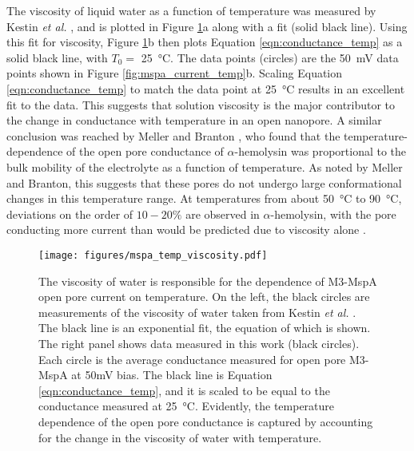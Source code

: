 The viscosity of liquid water as a function of temperature was measured by Kestin \textit{et al.} \cite{Kestin1978}, and is plotted in Figure \ref{fig:mspa_current_temp_viscosity}a along with a fit (solid black line).  Using this fit for viscosity, Figure \ref{fig:mspa_current_temp_viscosity}b then plots Equation \ref{eqn:conductance_temp} as a solid black line, with $T_0=$ \SI{25}{\degreeCelsius}.  The data points (circles) are the \SI{50}{\mV} data points shown in Figure \ref{fig:mspa_current_temp}b.  Scaling Equation \ref{eqn:conductance_temp} to match the data point at \SI{25}{\degreeCelsius} results in an excellent fit to the data.  This suggests that solution viscosity is the major contributor to the  change in conductance with temperature in an open nanopore.  A similar conclusion was reached by Meller and Branton \citep{Meller2002}, who found that the temperature-dependence of the open pore conductance of $\alpha$-hemolysin was proportional to the bulk mobility of the electrolyte as a function of temperature.  As noted by Meller and Branton, this suggests that these pores do not undergo large conformational changes in this temperature range.  At temperatures from about \SI{50}{\degreeCelsius} to \SI{90}{\degreeCelsius}, deviations on the order of $10-20\%$ are observed in $\alpha$-hemolysin, with the pore conducting more current than would be predicted due to viscosity alone \citep{Kang2005}.

\begin{figure}[h]
\begin{centering}
\texttt{[image: figures/mspa\_temp\_viscosity.pdf]}
\caption[MspA current versus temperature explained by viscosity]{The viscosity of water is responsible for the dependence of M3-MspA open pore current on temperature.  On the left, the black circles are measurements of the viscosity of water taken from Kestin \textit{et al.} \cite{Kestin1978}.  The black line is an exponential fit, the equation of which is shown.  The right panel shows data measured in this work (black circles).  Each circle is the average conductance measured for open pore M3-MspA at 50mV bias.  The black line is Equation \ref{eqn:conductance_temp}, and it is scaled to be equal to the conductance measured at \SI{25}{\degreeCelsius}.  Evidently, the temperature dependence of the open pore conductance is captured by accounting for the change in the viscosity of water with temperature.}
\label{fig:mspa_current_temp_viscosity}
\end{centering}
\end{figure}


